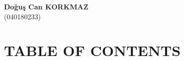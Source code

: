 \documentclass[12pt,a4paper]{report}
\newcommand{\sectionSpace}{\vspace*{72pt}}
\let\oldsection\section
\renewcommand{\section}{\sectionSpace\oldsection}
\begin{document}
\vspace{1cm}

\hspace{3cm}  \textbf{Doğuş Can KORKMAZ} \\

\hspace{3cm} (040180233) \\

\vspace{1cm}

\newpage


\section*{TABLE OF CONTENTS}
\tableofcontents

\newpage
\end{document}
